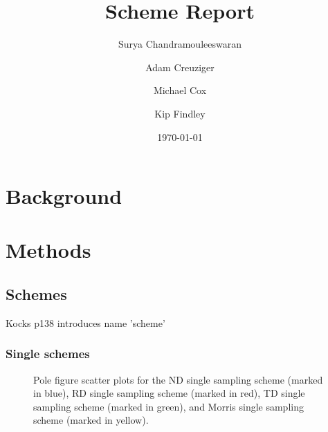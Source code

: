 \documentclass{article}
\begin{document}
\title{Scheme Report} %
\date{\today}
\author[1, 2]{Surya Chandramouleeswaran}
\author[3]{Adam Creuziger}
\author[2]{Michael Cox}
\author[2]{Kip Findley}


\maketitle

\section{Background}


\section{Methods}






\subsection{Schemes}


Kocks p138 introduces name 'scheme'



\subsubsection{Single schemes}
\begin{figure}[H]
    \centering
    \caption{Pole figure scatter plots for the ND single sampling scheme (marked in blue), RD single sampling scheme (marked in red), TD single sampling scheme (marked in green), and Morris single sampling scheme (marked in yellow).}
\end{figure}
\end{document}
